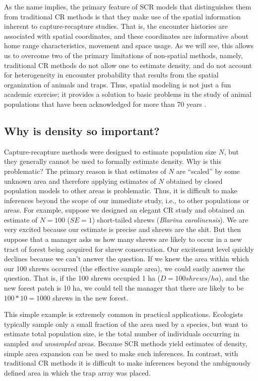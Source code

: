 As the name implies, the primary feature of SCR models that
distinguishes them from traditional CR methods is that they make use
of the spatial information inherent to capture-recapture studies. That
is, the encounter histories are associated with spatial coordinates,
and these coordinates are informative about home range
characteristics, movement and space usage.
As we will see, this allows us to overcome two of the
primary limitations of non-spatial methods, namely, traditional CR
methods do not allow one to estimate density, and do not account for
heterogeneity in encounter probability that results from the spatial
organization of animals and traps. Thus, spatial modeling is not just
a fun academic exercise; it provides a solution to basic problems in
the study of animal populations that have been acknowledged for more
than 70 years \citep{dice:1938}.

\subsection{Why is density so important? }

Capture-recapture methods were designed to estimate population size
$N$, but they generally cannot be used to
formally estimate density. Why is 
this problematic? 
The primary reason is that estimates of $N$ are ``scaled'' by some
unknown area and therefore applying estimates of $N$ obtained by
closed population models to other areas is problematic. Thus, it is
difficult to make 
inferences beyond the scope of our immediate study, i.e., to other
populations or areas. For example, suppose we designed an elegant
CR study and obtained an estimate of $N=100$ ($SE=1$) short-tailed
shrews ({\it Blarina carolinensis}). We are very excited because our
estimate is precise and shrews are the shit. But then suppose that a
manager asks us how many shrews are likely to occur in a new tract of
forest being acquired for shrew conservation. Our excitement level
quickly declines because we can't answer the question. If we knew the
area within which our 100 shrews occurred (the effective sample area),
we could easily answer the question. That is, if the 100 shrews
occupied 1 ha ($D=100 shrews/ha$), and the new forest patch is 10 ha,
we could tell the manager that there are likely to be $100*10 = 1000$
shrews in the new forest.

This simple example is extremely common in practical applications.
Ecologists typically sample only a small fraction of the area used by
a species, but want to estimate total population size, ie the total
number of individuals occurring in sampled {\it and unsampled}
areas. Because SCR methods yield estimates of density, simple area
expansion can be used to make such inferences. In contrast, with
traditional CR methods it is difficult to make inferences beyond the
ambiguously defined area in which the trap array was placed.

